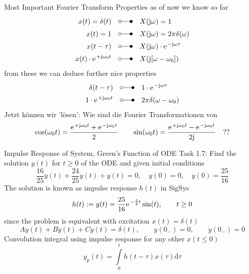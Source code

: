 \documentclass[mathserif, aspectratio=43]{intbeamer}
\newcommand\fsd{\mathrm{d}} %
\begin{document}
\begin{frame}{Most Important Fourier Transform Properties}
%
as of now we know so far
\begin{align*}
x(t)= \delta(t) &\quad \laplace \quad X(\im\omega)=1\\
x(t)= 1 &\quad \laplace \quad X(\im\omega)=2\pi \delta(\omega)\\
x(t - \tau) & \quad \laplace \quad X(\im\omega) \cdot \e^{-\im\omega \tau}\\
x(t) \cdot \e^{+\im\omega_0 t} & \quad \laplace \quad X(\im[\omega-\omega_0])
\end{align*}
%
from these we can deduce further nice properties
\begin{align*}
\delta(t-\tau)& \quad \laplace \quad 1 \cdot \e^{-\im\omega \tau}\\
1 \cdot \e^{+\im\omega_0 t} & \quad \laplace \quad 2\pi\delta(\omega-\omega_0)
\end{align*}
%
Jetzt können wir 'lösen': Wie sind die Fourier Transformationen von
\begin{align*}
\cos(\omega_0 t) = \frac{\e^{+\im\omega_0 t}+\e^{-\im\omega_0 t}}{2}\qquad
\sin(\omega_0 t) = \frac{\e^{+\im\omega_0 t}-\e^{-\im\omega_0 t}}{2\im}\quad??
\end{align*}
%
\end{frame}



\begin{frame}{Impulse Response of System, Green's Function of ODE}
Task 1.7: Find the solution $y(t)$ for $t\geq 0$ of the ODE and given initial conditions
$$\frac{16}{25} \ddot{y}(t) + \frac{24}{25} \dot{y}(t) + y(t) = 0,
\quad y(0)=0,\quad \dot{y}(0)=\frac{25}{16}$$
The solution is known as impulse response $h(t)$ in SigSys
$$h(t) := y(t) = \frac{25}{16} \e^{-\frac{3}{4} t} \sin(t), \qquad t\geq 0$$
since the problem is equivalent with excitation $x(t) = \delta(t)$
$$A \ddot{y}(t) + B \dot{y}(t) + C y(t) = \delta(t),\qquad {y}(0_-) = 0,\qquad \dot{y}(0_-) = 0$$
%
Convolution integral using impulse response for any other $x(t \leq 0)$
$$y_p(t) = \int\limits_{0}^{t} h(t-\tau) x(\tau) \fsd \tau$$
%
\end{frame}

\end{document}
